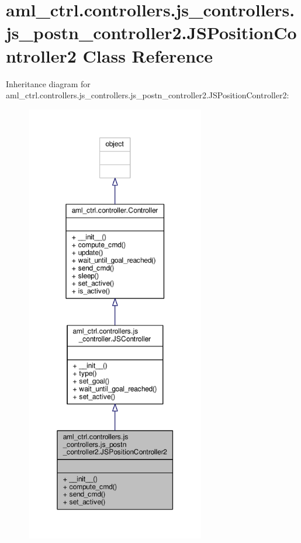 \hypertarget{classaml__ctrl_1_1controllers_1_1js__controllers_1_1js__postn__controller2_1_1_j_s_position_controller2}{\section{aml\-\_\-ctrl.\-controllers.\-js\-\_\-controllers.\-js\-\_\-postn\-\_\-controller2.\-J\-S\-Position\-Controller2 Class Reference}
\label{classaml__ctrl_1_1controllers_1_1js__controllers_1_1js__postn__controller2_1_1_j_s_position_controller2}
}


Inheritance diagram for aml\-\_\-ctrl.\-controllers.\-js\-\_\-controllers.\-js\-\_\-postn\-\_\-controller2.\-J\-S\-Position\-Controller2\-:
\nopagebreak
\begin{figure}[H]
\begin{center}
\leavevmode
\includegraphics[height=550pt]{classaml__ctrl_1_1controllers_1_1js__controllers_1_1js__postn__controller2_1_1_j_s_position_controller2__inherit__graph}
\end{center}
\end{figure}


